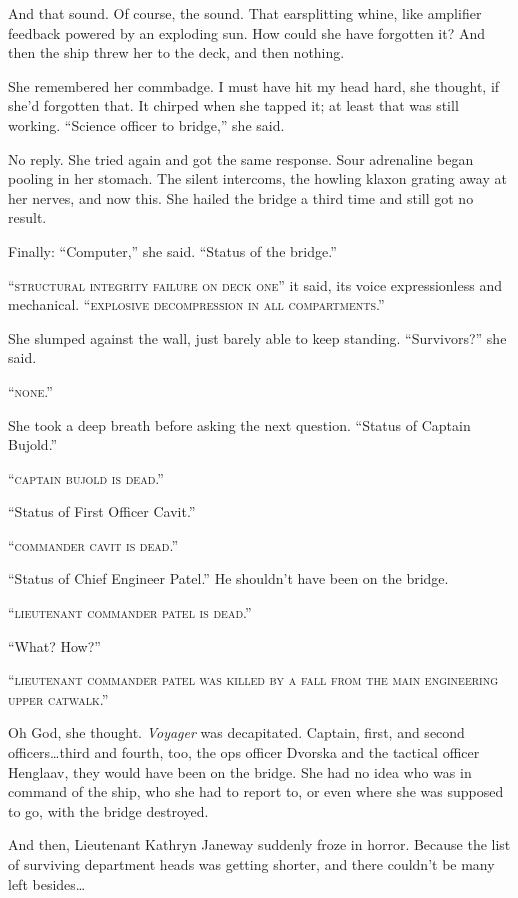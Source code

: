 \documentclass[twoside,letterpaper,12pt]{memoir}
\begin{document}
And that sound. Of course, the sound. That earsplitting whine, like amplifier feedback powered by an exploding sun. How could she have forgotten it? And then the ship threw her to the deck, and then nothing.

She remembered her commbadge. I must have hit my head hard, she thought, if she'd forgotten that. It chirped when she tapped it; at least that was still working. ``Science officer to bridge,'' she said.

No reply. She tried again and got the same response. Sour adrenaline began pooling in her stomach. The silent intercoms, the howling klaxon grating away at her nerves, and now this. She hailed the bridge a third time and still got no result.

Finally: ``Computer,'' she said. ``Status of the bridge.''

``\textsc{structural integrity failure on deck one}'' it said, its voice expressionless and mechanical. ``\textsc{explosive decompression in all compartments}.''

She slumped against the wall, just barely able to keep standing. ``Survivors?'' she said.

``\textsc{none}.''

She took a deep breath before asking the next question. ``Status of Captain Bujold.''

``\textsc{captain bujold is dead}.''

``Status of First Officer Cavit.''

``\textsc{commander cavit is dead}.''

``Status of Chief Engineer Patel.'' He shouldn't have been on the bridge.

``\textsc{lieutenant commander patel is dead}.''

``What? How?''

``\textsc{lieutenant commander patel was killed by a fall from the main engineering upper catwalk}.''

Oh God, she thought. \textit{Voyager} was decapitated. Captain, first, and second officers…third and fourth, too, the ops officer Dvorska and the tactical officer Henglaav, they would have been on the bridge. She had no idea who was in command of the ship, who she had to report to, or even where she was supposed to go, with the bridge destroyed.

And then, Lieutenant Kathryn Janeway suddenly froze in horror. Because the list of surviving department heads was getting shorter, and there couldn't be many left besides\ldots
\end{document}
